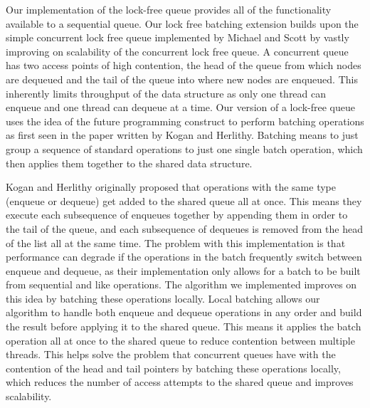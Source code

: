 Our implementation of the lock-free queue provides all of the functionality available to a sequential queue. Our lock free batching extension builds upon the simple concurrent lock free queue implemented by Michael and Scott by vastly improving on scalability of the concurrent lock free queue. A concurrent queue has two access points of high contention, the head of the queue from which nodes are dequeued and the tail of the queue into where new nodes are enqueued. This inherently limits throughput of the data structure as only one thread can enqueue and one thread can dequeue at a time. Our version of a lock-free queue uses the idea of the future programming construct to perform batching operations as first seen in the paper written by Kogan and Herlithy\parencite{r4}. Batching means to just group a sequence of standard operations to just one single batch operation, which then applies them together to the shared data structure. 

Kogan and Herlithy originally proposed that operations with the same type (enqueue or dequeue) get added to the shared queue all at once. This means they execute each subsequence of enqueues together by appending them in order to the tail of the queue, and each subsequence of dequeues is removed from the head of the list all at the same time. The problem with this implementation is that performance can degrade if the operations in the batch frequently switch between enqueue and dequeue, as their implementation only allows for a batch to be built from sequential and like operations. The algorithm we implemented improves on this idea by batching these operations locally. Local batching allows our algorithm to handle both enqueue and dequeue operations in any order and build the result before applying it to the shared queue. This means it applies the batch operation all at once to the shared queue to reduce contention between multiple threads. This helps solve the problem that concurrent queues have with the contention of the head and tail pointers by batching these operations locally, which reduces the number of access attempts to the shared queue and improves scalability. 
